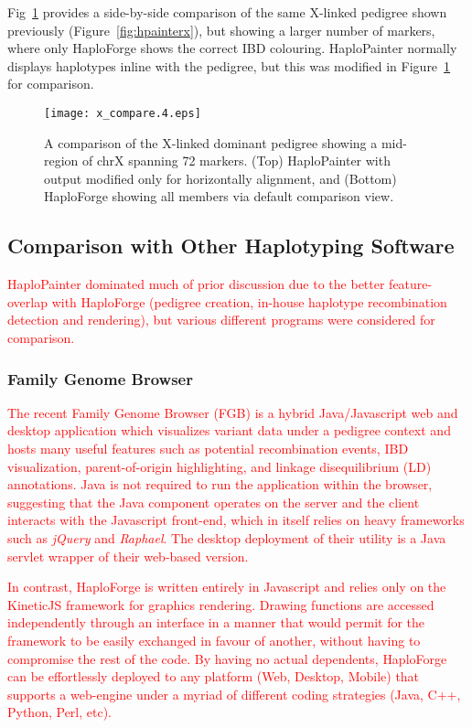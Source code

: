 \documentclass{bioinfo}
\numberwithin{equation}{section}
\def\haplo{{HaploForge}}
\def\hpainter{{HaploPainter}}
\newcommand{\changes}[1]{\textcolor{red}{#1}}
\begin{document}
Fig~\ref{fig:xcomp} provides a side-by-side comparison of the same X-linked pedigree shown previously (Figure~\ref{fig:hpainterx}), but showing a larger number of markers, where only \haplo{} shows the correct IBD colouring. \hpainter{} normally displays haplotypes inline with the pedigree, but this was modified in Figure~\ref{fig:xcomp} for comparison.


\begin{figure}[!tpb]
	\centerline{\texttt{[image: x\_compare.4.eps]}}\caption{A comparison of the X-linked dominant pedigree showing a mid-region of chrX spanning 72 markers. (Top) \hpainter{} with output modified only for horizontally alignment, and (Bottom) \haplo{} showing all members via default comparison view.}\label{fig:xcomp}
\end{figure}


\subsection{Comparison with Other Haplotyping Software}

\changes{\hpainter{} dominated much of prior discussion due to the better feature-overlap with \haplo{} (pedigree creation, in-house haplotype recombination detection and rendering), but various different programs were considered for comparison.}

\subsubsection{Family Genome Browser}

\changes{The recent Family Genome Browser (FGB) \citep{familygenomebrowser} is a hybrid Java/Javascript web and desktop application which visualizes variant data under a pedigree context and hosts many useful features such as potential recombination events, IBD visualization, parent-of-origin highlighting, and linkage disequilibrium (LD) annotations. Java is not required to run the application within the browser, suggesting that the Java component operates on the server and the client interacts with the Javascript front-end, which in itself relies on heavy frameworks such as \textit{jQuery} and \textit{Raphael}. The desktop deployment of their utility is a Java servlet wrapper of their web-based version.}

\changes{In contrast, \haplo{} is written entirely in Javascript and relies only on the KineticJS framework for graphics rendering. Drawing functions are accessed independently through an interface in a manner that would permit for the framework to be easily exchanged in favour of another, without having to compromise the rest of the code. By having no actual dependents, \haplo{} can be effortlessly deployed to any platform (Web, Desktop, Mobile) that supports a web-engine under a myriad of different coding strategies (Java, C++, Python, Perl, etc).}
\end{document}
